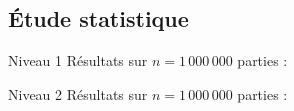 \subsection{Étude statistique}

\begin{frame}{Niveau 1}
Résultats sur $n=1\,000\,000$ parties :
\begin{center}
\end{center}
\end{frame}

\begin{frame}{Niveau 2}
Résultats sur $n=1\,000\,000$ parties :
\begin{center}
\end{center}
\end{frame}

